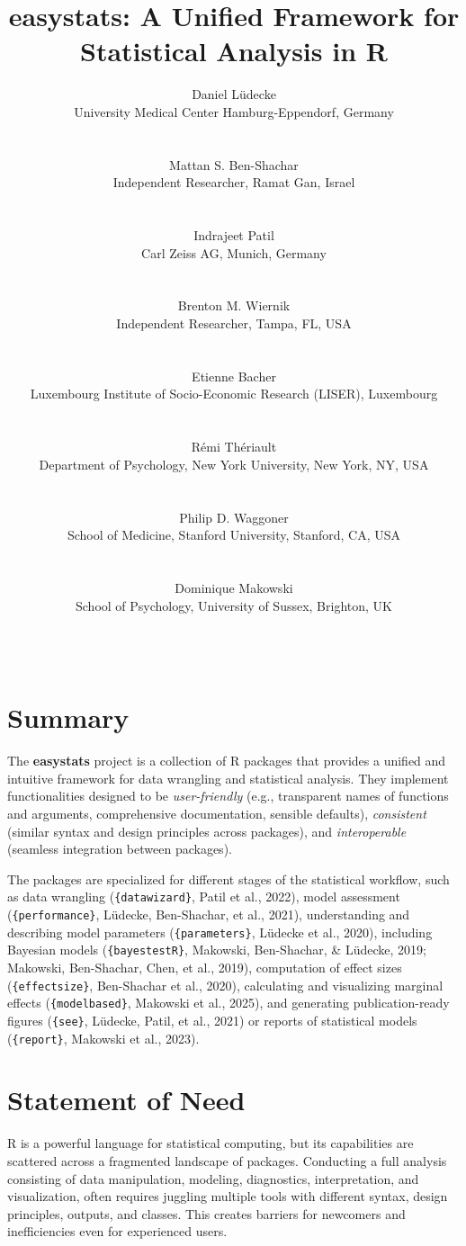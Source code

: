\documentclass{article}
\title{easystats: A Unified Framework for Statistical Analysis in R}
\author{
    Daniel Lüdecke
   \\
    University Medical Center Hamburg-Eppendorf, Germany \\
   \\
  \texttt{} \\
   \And
    Mattan S. Ben-Shachar
   \\
    Independent Researcher, Ramat Gan, Israel \\
   \\
  \texttt{} \\
   \And
    Indrajeet Patil
   \\
    Carl Zeiss AG, Munich, Germany \\
   \\
  \texttt{} \\
   \And
    Brenton M. Wiernik
   \\
    Independent Researcher, Tampa, FL, USA \\
   \\
  \texttt{} \\
   \And
    Etienne Bacher
   \\
    Luxembourg Institute of Socio-Economic Research (LISER),
Luxembourg \\
   \\
  \texttt{} \\
   \And
    Rémi Thériault
   \\
    Department of Psychology, New York University, New York, NY, USA \\
   \\
  \texttt{} \\
   \And
    Philip D. Waggoner
   \\
    School of Medicine, Stanford University, Stanford, CA, USA \\
   \\
  \texttt{} \\
   \And
    Dominique Makowski
   \\
    School of Psychology, University of Sussex, Brighton, UK \\
   \\
  \texttt{} \\
  }
\begin{document}
\maketitle


\begin{abstract}

\end{abstract}


\section{Summary}\label{summary}

The \textbf{easystats} project is a collection of R packages that
provides a unified and intuitive framework for data wrangling and
statistical analysis. They implement functionalities designed to be
\emph{user-friendly} (e.g., transparent names of functions and
arguments, comprehensive documentation, sensible defaults),
\emph{consistent} (similar syntax and design principles across
packages), and \emph{interoperable} (seamless integration between
packages).

The packages are specialized for different stages of the statistical
workflow, such as data wrangling (\texttt{\{datawizard\}}, Patil et al.,
2022), model assessment (\texttt{\{performance\}}, Lüdecke, Ben-Shachar,
et al., 2021), understanding and describing model parameters
(\texttt{\{parameters\}}, Lüdecke et al., 2020), including Bayesian
models (\texttt{\{bayestestR\}}, Makowski, Ben-Shachar, \& Lüdecke,
2019; Makowski, Ben-Shachar, Chen, et al., 2019), computation of effect
sizes (\texttt{\{effectsize\}}, Ben-Shachar et al., 2020), calculating
and visualizing marginal effects (\texttt{\{modelbased\}}, Makowski et
al., 2025), and generating publication-ready figures (\texttt{\{see\}},
Lüdecke, Patil, et al., 2021) or reports of statistical models
(\texttt{\{report\}}, Makowski et al., 2023).

\section{Statement of Need}\label{statement-of-need}

R is a powerful language for statistical computing, but its capabilities
are scattered across a fragmented landscape of packages. Conducting a
full analysis consisting of data manipulation, modeling, diagnostics,
interpretation, and visualization, often requires juggling multiple
tools with different syntax, design principles, outputs, and classes.
This creates barriers for newcomers and inefficiencies even for
experienced users.
\end{document}
